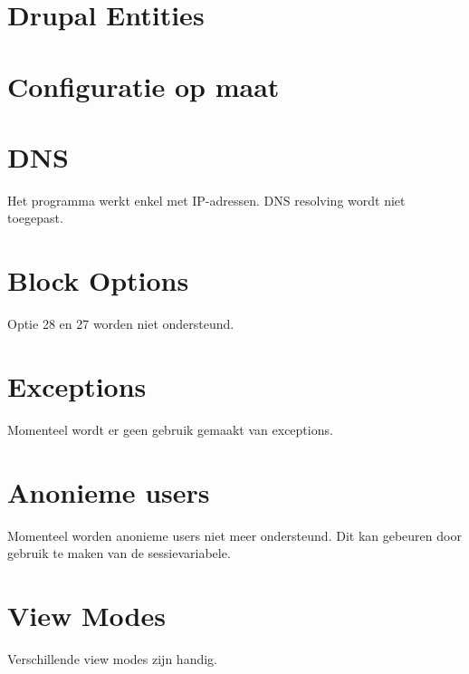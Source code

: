 \section{Drupal Entities}

\section{Configuratie op maat} \label{configuratie}


\section{DNS}
Het programma werkt enkel met IP-adressen. DNS resolving wordt niet toegepast.

\section{Block Options}
Optie 28 en 27 worden niet ondersteund.

\section{Exceptions}
Momenteel wordt er geen gebruik gemaakt van exceptions.

\section{Anonieme users}
Momenteel worden anonieme users niet meer ondersteund. Dit kan gebeuren door gebruik te maken van de sessievariabele.

\section{View Modes}
Verschillende view modes zijn handig.